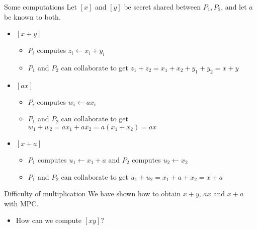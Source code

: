 \begin{frame}{Some computations}
  Let $[x]$ and $[y]$ be secret shared between $P_1, P_2$, and let $a$ be known to both.
  \begin{itemize}[<+(1)->]
    \item $[x + y]$
    \begin{itemize}
      \item $P_i$ computes $z_i \gets x_i + y_i$
      \item $P_1$ and $P_2$ can collaborate to get $z_1 + z_2 = x_1 + x_2 + y_1 + y_2 = x + y$
    \end{itemize}
    \item $[ax]$
    \begin{itemize}
      \item $P_i$ computes $w_i \gets ax_i$
      \item $P_1$ and $P_2$ can collaborate to get $w_1 + w_2 = ax_1 + ax_2 = a(x_1 + x_2) = ax$
    \end{itemize}
    \item $[x + a]$
    \begin{itemize}
      \item $P_1$ computes $u_1 \gets x_1 + a$ and $P_2$ computes $u_2 \gets x_2$
      \item $P_1$ and $P_2$ can collaborate to get $u_1 + u_2 = x_1 + a + x_2 = x + a$
    \end{itemize}
  \end{itemize}
\end{frame}

\begin{frame}{Difficulty of multiplication}
  We have shown how to obtain $x + y$, $ax$ and $x + a$ with MPC.
  \begin{itemize}[<+(1)->]
    \item How can we compute $[xy]$?
  \end{itemize}
\end{frame}

